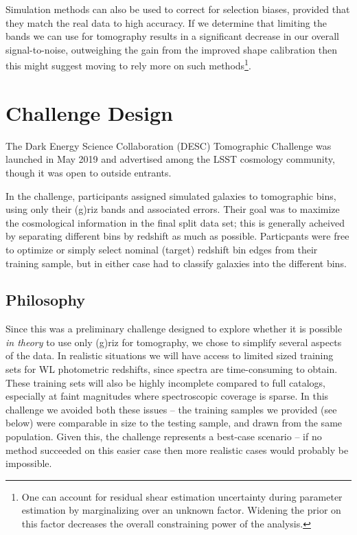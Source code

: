 \documentclass[twocolumn,twocolappendix]{aastex63}
\begin{document}
Simulation methods can also be used to correct for selection biases, provided that they match the
real data to high accuracy.  If we determine that limiting the bands we can use for tomography results
in a significant decrease in our overall signal-to-noise, outweighing the gain from the improved shape
calibration then this might suggest moving to rely more on such methods\footnote{One can account for
residual shear estimation uncertainty during parameter estimation by marginalizing over an unknown
factor.  Widening the prior on this factor decreases the overall constraining power of the analysis.}.


\section{Challenge Design}

The Dark Energy Science Collaboration (DESC) Tomographic Challenge was launched in May 2019 and 
advertised among the LSST cosmology community, though it was open to outside entrants.

In the challenge, participants assigned simulated galaxies to tomographic bins,
using only their (g)riz bands and associated errors.  Their goal was to maximize the cosmological
information in the final split data set; this is generally acheived by separating different bins by 
redshift as much as possible.  Particpants were free to optimize or simply select nominal (target) 
redshift bin edges from their training sample, but in either case had to classify galaxies into the 
different bins.

\subsection{Philosophy}

Since this was a preliminary challenge designed to explore whether it is possible \emph{in theory}
to use only (g)riz for tomography, we chose to simplify several aspects of the data.  In realistic 
situations we will have access to limited sized training sets for WL photometric redshifts, since 
spectra are time-consuming to obtain.  These training sets will also be highly incomplete compared
to full catalogs, especially at faint magnitudes where spectroscopic coverage is sparse.  In this
challenge we avoided both these issues -- the training samples we provided (see below) were comparable
in size to the testing sample, and drawn from the same population.  Given this, the challenge
represents a best-case scenario -- if no method succeeded on this easier case then more realistic
cases would probably be impossible.
\end{document}
